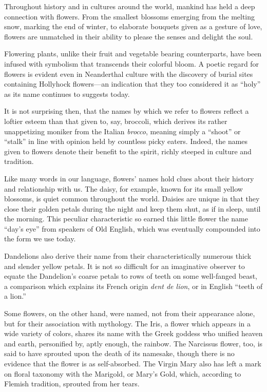 Throughout history and in cultures around the world, mankind has held a deep
connection with flowers. From the smallest blossoms emerging from the melting
snow, marking the end of winter, to elaborate bouquets given as a gesture of
love, flowers are unmatched in their ability to please the senses and delight
the soul.

Flowering plants, unlike their fruit and vegetable bearing counterparts, have
been infused with symbolism that transcends their colorful bloom. A poetic
regard for flowers is evident even in Neanderthal culture with the discovery of
burial sites containing Hollyhock flowers---an indication that they too
considered it as ``holy'' as its name continues to suggests today.

It is not surprising then, that the names by which we refer to flowers reflect
a loftier esteem than that given to, say, broccoli, which derives its rather
unappetizing moniker from the Italian {\it brocco}, meaning simply a ``shoot'' or
``stalk'' in line with opinion held by countless picky eaters. Indeed, the
names given to flowers denote their benefit to the spirit, richly steeped in
culture and tradition.

Like many words in our language, flowers' names hold clues about their history
and relationship with us. The daisy, for example, known for its small yellow
blossoms, is quiet common throughout the world. Daisies are unique in that they
close their golden petals during the night and keep them shut, as if in sleep,
until the morning. This peculiar characteristic so earned this little flower
the name ``day's eye'' from speakers of Old English, which was eventually
compounded into the form we use today.

Dandelions also derive their name from their characteristically numerous thick
and slender yellow petals. It is not so difficult for an imaginative observer
to equate the Dandelion's coarse petals to rows of teeth on some well-fanged
beast, a comparison which explains its French origin {\it dent de lion}, or in
English ``teeth of a lion.''

Some flowers, on the other hand, were named, not from their appearance alone,
but for their association with mythology. The Iris, a flower which appears in
a wide variety of colors, shares its name with the Greek goddess who unified
heaven and earth, personified by, aptly enough, the rainbow. The Narcissus
flower, too, is said to have sprouted upon the death of its namesake, though
there is no evidence that the flower is as self-absorbed. The Virgin Mary also
has left a mark on floral taxonomy with the Marigold, or Mary's Gold, which,
according to Flemish tradition, sprouted from her tears.

